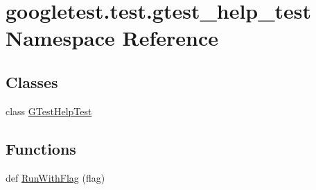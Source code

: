 \hypertarget{namespacegoogletest_1_1test_1_1gtest__help__test}{}\section{googletest.\+test.\+gtest\+\_\+help\+\_\+test Namespace Reference}
\label{namespacegoogletest_1_1test_1_1gtest__help__test}
\subsection*{Classes}
\begin{DoxyCompactItemize}
\item 
class \mbox{\hyperlink{classgoogletest_1_1test_1_1gtest__help__test_1_1_g_test_help_test}{G\+Test\+Help\+Test}}
\end{DoxyCompactItemize}
\subsection*{Functions}
\begin{DoxyCompactItemize}
\item 
def \mbox{\hyperlink{namespacegoogletest_1_1test_1_1gtest__help__test_a8a458d794d12c66871ed04be8a587b9e}{Run\+With\+Flag}} (flag)
\end{DoxyCompactItemize}

